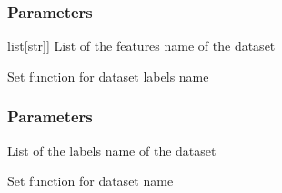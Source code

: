 \documentclass[letterpaper,10pt,english]{sphinxmanual}
\begin{document}
\begin{fulllineitems}
\begin{fulllineitems}
\subsubsection{Parameters}
\label{\detokenize{data/_autosummary/miml.data.miml_dataset.MIMLDataset:id32}}\begin{description}
\sphinxlineitem{features}{[}list{[}str{]}{]}
\sphinxAtStartPar
List of the features name of the dataset

\end{description}

\end{fulllineitems}


\begin{fulllineitems}
\label{\detokenize{data/_autosummary/miml.data.miml_dataset.MIMLDataset:miml.data.miml_dataset.MIMLDataset.set_labels_name}}
\pysigstartsignatures
{}
\pysigstopsignatures
\sphinxAtStartPar
Set function for dataset labels name


\subsubsection{Parameters}
\label{\detokenize{data/_autosummary/miml.data.miml_dataset.MIMLDataset:id33}}\begin{description}
\sphinxAtStartPar
List of the labels name of the dataset

\end{description}

\end{fulllineitems}


\begin{fulllineitems}
\label{\detokenize{data/_autosummary/miml.data.miml_dataset.MIMLDataset:miml.data.miml_dataset.MIMLDataset.set_name}}
\pysigstartsignatures
{}
\pysigstopsignatures
\sphinxAtStartPar
Set function for dataset name



\end{fulllineitems}
\end{fulllineitems}
\end{document}

